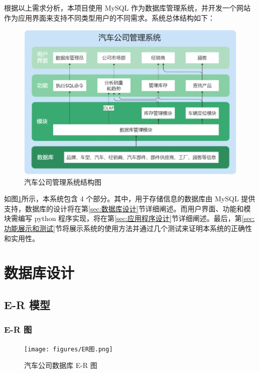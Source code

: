 \documentclass[hyperref,a4paper,UTF8]{ctexart}
\begin{document}
根据以上需求分析，本项目使用 MySQL 作为数据库管理系统，并开发一个网站作为应用界面来支持不同类型用户的不同需求。系统总体结构如下：

\begin{figure}[h]
    \centering
    \includegraphics[width=\textwidth]{figures/系统结构图.png}
    \caption{汽车公司管理系统结构图}
    \label{fig:汽车公司管理系统结构图}
\end{figure}

如图\ref{fig:汽车公司管理系统结构图}所示，本系统包含 4 个部分。其中，用于存储信息的数据库由 MySQL 提供支持，数据库的设计将在第\ref{sec:数据库设计}节详细阐述。而用户界面、功能和模块需编写 python 程序实现，将在第\ref{sec:应用程序设计}节详细阐述。最后，第\ref{sec:功能展示和测试}节将展示系统的使用方法并通过几个测试来证明本系统的正确性和实用性。

\section{数据库设计\label{sec:数据库设计}}

\subsection{E-R 模型\label{sec:E-R模型}}

\subsubsection{E-R 图}

\begin{figure}[h]
    \centering
    \texttt{[image: figures/ER图.png]}
    \caption{汽车公司数据库 E-R 图}
    \label{fig:ER图}
\end{figure}
\end{document}
